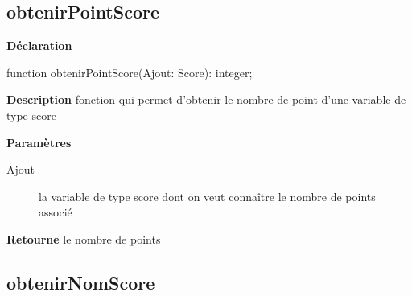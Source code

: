 \documentclass{report}
\newif\ifpdf
\begin{document}
\subsection*{obtenirPointScore}
\fi
\label{Types-obtenirPointScore}
\begin{list}{}{
\setlength{\itemindent}{0cm}
\setlength{\listparindent}{0cm}
\setlength{\leftmargin}{\evensidemargin}
\addtolength{\leftmargin}{\tmplength}
\settowidth{\labelsep}{X}
\addtolength{\leftmargin}{\labelsep}
\setlength{\labelwidth}{\tmplength}
}
\item[\textbf{Déclaration}\hfill]
\ifpdf
\begin{flushleft}
\fi
\begin{ttfamily}
function obtenirPointScore(Ajout: Score): integer;\end{ttfamily}

\ifpdf
\end{flushleft}
\fi

\par
\item[\textbf{Description}]
fonction qui permet d'obtenir le nombre de point d'une variable de type score  \par
\item[\textbf{Paramètres}]
\begin{description}
\item[Ajout] la variable de type score dont on veut connaître le nombre de points associé
\end{description}
\item[\textbf{Retourne}]le nombre de points


\end{list}
\ifpdf
\subsection*{\large{\textbf{obtenirNomScore}}\normalsize\hspace{1ex}\hrulefill}
\else
\end{document}
